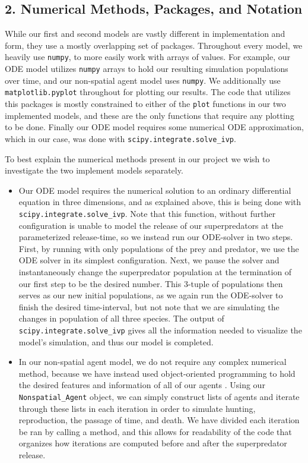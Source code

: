 \documentclass{article}
\begin{document}
\subsection*{2. Numerical Methods, Packages, and Notation}
While our first and second models are vastly different in implementation and form, they use a mostly overlapping set of packages. Throughout every model, we heavily use \verb|numpy|, to more easily work with arrays of values. For example, our ODE model utilizes \verb|numpy| arrays to hold our resulting simulation populations over time, and our non-spatial agent model uses \verb|numpy|. We additionally use \verb|matplotlib.pyplot| throughout for plotting our results. The code that utilizes this packages is mostly constrained to either of the \verb|plot| functions in our two implemented models, and these are the only functions that require any plotting to be done. Finally our ODE model requires some numerical ODE approximation, which in our case, was done with \verb|scipy.integrate.solve_ivp|.\par
To best explain the numerical methods present in our project we wish to investigate the two implement models separately.\begin{itemize}
    \item Our ODE model requires the numerical solution to an ordinary differential equation in three dimensions, and as explained above, this is being done with \verb|scipy.integrate.solve_ivp|. Note that this function, without further configuration is unable to model the release of our superpredators at the parameterized release-time, so we instead run our ODE-solver in two steps. First, by running with only populations of the prey and predator, we use the ODE solver in its simplest configuration. Next, we pause the solver and instantaneously change the superpredator population at the termination of our first step to be the desired number. This 3-tuple of populations then serves as our new initial populations, as we again run the ODE-solver to finish the desired time-interval, but not note that we are simulating the changes in population of all three species. The output of \verb|scipy.integrate.solve_ivp| gives all the information needed to visualize the model's simulation, and thus our model is completed.
    \item In our non-spatial agent model, we do not require any complex numerical method, because we have instead used object-oriented programming to hold the desired features and information of all of our agents \cite{Agents.jl}. Using our \verb|Nonspatial_Agent| object, we can simply construct lists of agents and iterate through these lists in each iteration in order to simulate hunting, reproduction, the passage of time, and death. We have divided each iteration be ran by calling a method, and this allows for readability of the code that organizes how iterations are computed before and after the superpredator release.
\end{itemize}
\end{document}
